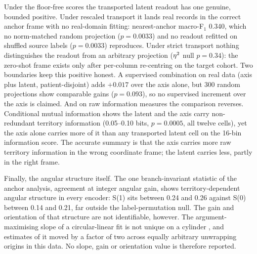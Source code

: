 Under the floor-free scores the transported latent readout has one genuine, bounded positive. Under rescaled transport it lands real records in the correct anchor frame with no real-domain fitting: nearest-anchor macro-F$_1$ 0.340, which no norm-matched random projection ($p=0.0033$) and no readout refitted on shuffled source labels ($p=0.0033$) reproduces. Under strict transport nothing distinguishes the readout from an arbitrary projection ($\eta^{2}$ null $p=0.34$): the zero-shot frame exists only after per-column re-centring on the target cohort.  Two boundaries keep this positive honest. A supervised combination on real data (axis plus latent, patient-disjoint) adds $+0.017$ over the axis alone, but 300 random projections show comparable gains ($p=0.093$), so no supervised increment over the axis is claimed. And on raw information measures the comparison reverses. Conditional mutual information shows the latent and the axis carry non-redundant territory information (0.05--0.10 bits, $p=0.0005$, all twelve cells), yet the axis alone carries more of it than any transported latent cell on the 16-bin information score. The accurate summary is that the axis carries more raw territory information in the wrong coordinate frame; the latent carries less, partly in the right frame. 

Finally, the angular structure itself. The one branch-invariant statistic of the anchor analysis, agreement at integer angular gain, shows territory-dependent angular structure in every encoder: S(1) sits between 0.24 and 0.26 against S(0) between 0.14 and 0.21, far outside the label-permutation null. The gain and orientation of that structure are not identifiable, however. The argument-maximising slope of a circular-linear fit is not unique on a cylinder \citep{kempter2012quantifying}, and estimates of it moved by a factor of two across equally arbitrary unwrapping origins in this data. No slope, gain or orientation value is therefore reported. 

